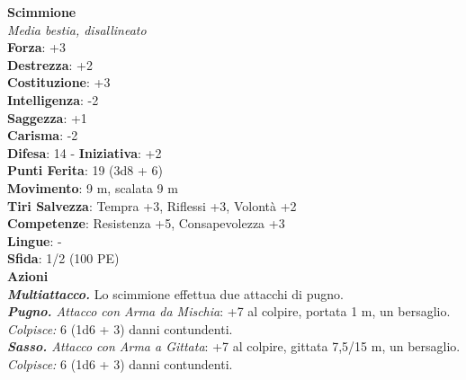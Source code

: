 \begin{multicols}{2}
\medskip\textbf{Scimmione}\\
\emph{Media bestia, disallineato}\\
\textbf{Forza}: +3\\
\textbf{Destrezza}: +2\\
\textbf{Costituzione}: +3\\
\textbf{Intelligenza}: -2\\
\textbf{Saggezza}: +1\\
\textbf{Carisma}: -2\\
\textbf{Difesa}: 14 - \textbf{Iniziativa}: +2\\
\textbf{Punti Ferita}: 19 (3d8 + 6)\\
\textbf{Movimento}: 9 m, scalata 9 m\\
\textbf{Tiri Salvezza}: Tempra +3, Riflessi +3, Volontà +2\\
\textbf{Competenze}: Resistenza +5, Consapevolezza +3\\
\textbf{Lingue}: -\\
\textbf{Sfida}: 1/2 (100 PE)\smallskip\\
\smallskip\textbf{Azioni}\\
\emph{\textbf{Multiattacco.}} Lo scimmione effettua due attacchi di pugno.\\
\emph{\textbf{Pugno.} Attacco con Arma da Mischia}: +7 al colpire, portata 1 m, un bersaglio.\\
\emph{Colpisce:} 6 (1d6 + 3) danni contundenti.\\
\emph{\textbf{Sasso.} Attacco con Arma a Gittata}: +7 al colpire, gittata 7,5/15 m, un bersaglio.\\
\emph{Colpisce:} 6 (1d6 + 3) danni contundenti.\\


\end{multicols}
